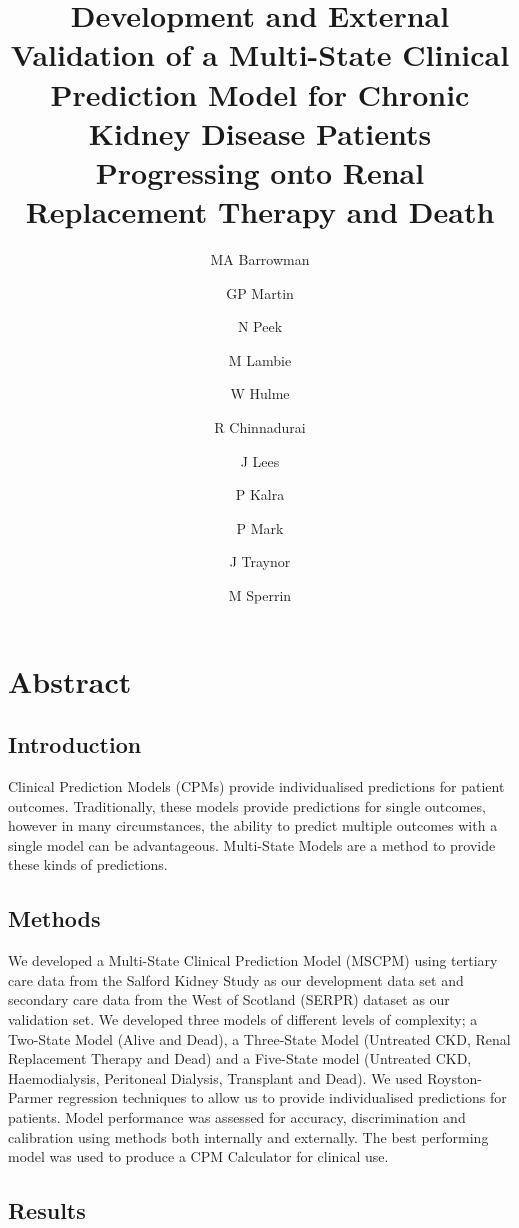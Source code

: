 \documentclass[
]{article}
\title{Development and External Validation of a Multi-State Clinical Prediction Model for Chronic Kidney Disease Patients Progressing onto Renal Replacement Therapy and Death}
\author{MA Barrowman \and GP Martin \and N Peek \and M Lambie \and W Hulme \and R Chinnadurai \and J Lees \and P Kalra \and P Mark \and J Traynor \and M Sperrin}
\date{}
\begin{document}
\maketitle

{
\setcounter{tocdepth}{2}
\tableofcontents
}
\hypertarget{abstract}{%
\section*{Abstract}\label{abstract}}

\hypertarget{introduction}{%
\subsection*{Introduction}\label{introduction}}

Clinical Prediction Models (CPMs) provide individualised predictions for patient outcomes. Traditionally, these models provide predictions for single outcomes, however in many circumstances, the ability to predict multiple outcomes with a single model can be advantageous. Multi-State Models are a method to provide these kinds of predictions.

\hypertarget{methods}{%
\subsection*{Methods}\label{methods}}

We developed a Multi-State Clinical Prediction Model (MSCPM) using tertiary care data from the Salford Kidney Study as our development data set and secondary care data from the West of Scotland (SERPR) dataset as our validation set. We developed three models of different levels of complexity; a Two-State Model (Alive and Dead), a Three-State Model (Untreated CKD, Renal Replacement Therapy and Dead) and a Five-State model (Untreated CKD, Haemodialysis, Peritoneal Dialysis, Transplant and Dead). We used Royston-Parmer regression techniques to allow us to provide individualised predictions for patients. Model performance was assessed for accuracy, discrimination and calibration using methods both internally and externally. The best performing model was used to produce a CPM Calculator for clinical use.

\hypertarget{results}{%
\subsection*{Results}\label{results}}
\end{document}
